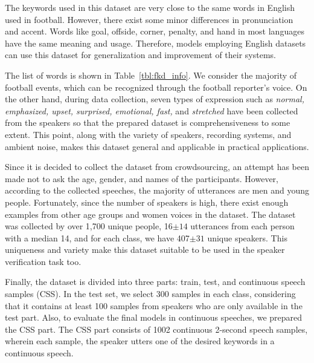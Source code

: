 \documentclass{article}
\begin{document}
The keywords used in this dataset are very close to the same words in English used in football. However, there exist some minor differences in pronunciation and accent. Words like goal, offside, corner, penalty, and hand in most languages have the same meaning and usage. Therefore, models employing English datasets can use this dataset for generalization and improvement of their systems.

The list of words is shown in Table~\ref{tbl:fkd_info}. We consider the majority of football events, which can be recognized through the football reporter's voice. On the other hand, during data collection, seven types of expression such as \textit{normal, emphasized, upset, surprised, emotional, fast,} and \textit{stretched} have been collected from the speakers so that the prepared dataset is comprehensiveness to some extent. This point, along with the variety of speakers, recording systems, and ambient noise, makes this dataset general and applicable in practical applications.

Since it is decided to collect the dataset from crowdsourcing, an attempt has been made not to ask the age, gender, and names of the participants. However, according to the collected speeches, the majority of utterances are men and young people. Fortunately, since the number of speakers is high, there exist enough examples from other age groups and women voices in the dataset. The dataset was collected by over 1,700 unique people,  16$\pm{14}$ utterances from each person with a median 14, and for each class, we have 407$\pm{31}$ unique speakers. This uniqueness and variety make this dataset suitable to be used in the speaker verification task too.

Finally, the dataset is divided into three parts: train, test, and continuous speech samples (CSS). In the test set, we select 300 samples in each class, considering that it contains at least 100 samples from speakers who are only available in the test part. Also, to evaluate the final models in continuous speeches, we prepared the CSS part. The CSS part consists of 1002 continuous 2-second speech samples, wherein each sample, the speaker utters one of the desired keywords in a continuous speech.
\end{document}
